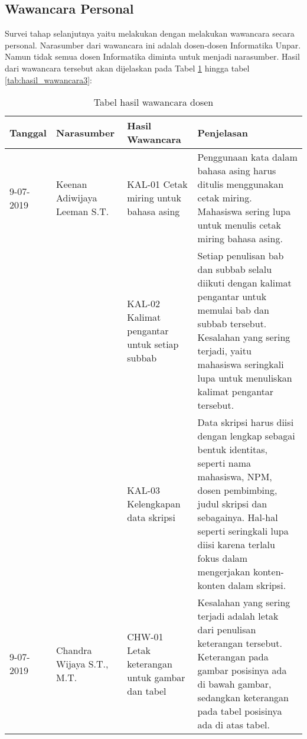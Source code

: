\subsection{Wawancara Personal}
Survei tahap selanjutnya yaitu melakukan dengan melakukan wawancara secara personal. Narasumber dari wawancara ini adalah dosen-dosen Informatika Unpar. Namun tidak semua dosen Informatika diminta untuk menjadi narasumber. Hasil dari wawancara tersebut akan dijelaskan pada Tabel \ref{tab:hasil_wawancara1} hingga tabel \ref{tab:hasil_wawancara3}:

\begin{table}[H]
	\renewcommand{\arraystretch}{1.5}
	\caption {Tabel hasil wawancara dosen} \label{tab:hasil_wawancara1}
	\begin{center}
		\begin{tabular}{|p{2 cm}|>{\raggedright} p{3.5 cm}| p{4 cm}| p{5 cm}|}
		\hline
		Tanggal & Narasumber & Hasil Wawancara & Penjelasan \\ 
		\hline
		9-07-2019 & Keenan Adiwijaya Leeman S.T. & KAL-01 \newline Cetak miring untuk bahasa asing & Penggunaan kata dalam bahasa asing harus ditulis menggunakan cetak miring. Mahasiswa sering lupa untuk menulis cetak miring bahasa asing. \newline \\ 
		\hline
		 & & KAL-02 \newline Kalimat pengantar untuk setiap subbab & Setiap penulisan bab dan subbab selalu diikuti dengan kalimat pengantar untuk memulai bab dan subbab tersebut. Kesalahan yang sering terjadi, yaitu mahasiswa seringkali lupa untuk menuliskan kalimat pengantar tersebut. \newline \\ 
		\hline 
		 & & KAL-03 \newline Kelengkapan data skripsi & Data skripsi harus diisi dengan lengkap sebagai bentuk identitas, seperti nama mahasiswa, NPM, dosen pembimbing, judul skripsi dan sebagainya. Hal-hal seperti seringkali lupa diisi karena terlalu fokus dalam mengerjakan konten-konten dalam skripsi. \newline \\
		\hline
		9-07-2019 & Chandra Wijaya S.T., M.T. & CHW-01 \newline Letak keterangan untuk gambar dan tabel & Kesalahan yang sering terjadi adalah letak dari penulisan keterangan tersebut. Keterangan pada gambar posisinya ada di bawah gambar, sedangkan keterangan pada tabel posisinya ada di atas tabel. \newline \\ 
		\hline
		\end{tabular}
	\end{center}
\end{table}

